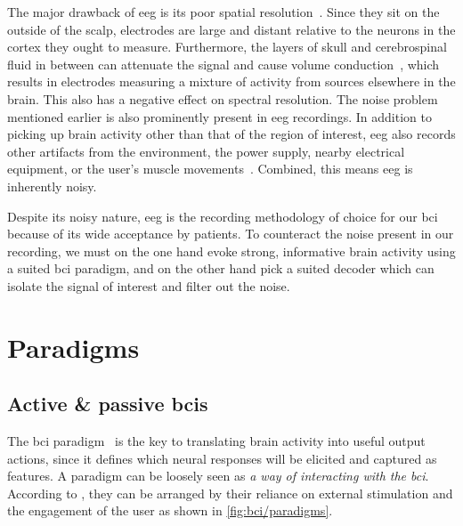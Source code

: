 The major drawback of \ac{eeg} is its poor spatial resolution~\cite{Ferree2001}.
Since they sit on the outside of the scalp, electrodes are large and distant relative to
the neurons in the cortex they ought to measure.
Furthermore, the layers of skull and cerebrospinal fluid in between can attenuate the
signal and cause volume conduction~\cite{Broek1998}, which results in electrodes
measuring a mixture of activity from sources elsewhere in the brain.
This also has a negative effect on spectral resolution.
The noise problem mentioned earlier is also prominently present in \ac{eeg} recordings.
In addition to picking up brain activity other than that of the region of interest,
\ac{eeg} also records other artifacts from the environment, the power supply, nearby
electrical equipment, or the user's muscle movements~\cite{Urigueen2015}.
Combined, this means \ac{eeg} is inherently noisy.

Despite its noisy nature, \ac{eeg} is the recording methodology of choice for our
\ac{bci} because of its wide acceptance by patients.
To counteract the noise present in our recording, we must on the one hand evoke strong,
informative brain activity using a suited \ac{bci} paradigm, and on the other hand pick
a suited decoder which can isolate the signal of interest and filter out the noise.


\section{Paradigms}
\label{sec:bci/paradigms}

\subsection{Active \& passive \acsp{bci}}

The \ac{bci} paradigm~\cite{Xu2021,Neeling2019} is the key to translating brain activity
into useful output actions, since it defines which neural responses will be elicited and
captured as features.
A paradigm can be loosely seen as \emph{a way of interacting with the \ac{bci}}.
According to \textcite{Zander2011}, they can be arranged by their reliance on external
stimulation and the engagement of the user as shown in \cref{fig:bci/paradigms}.


